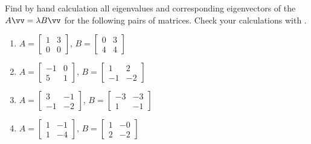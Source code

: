 \begin{exercise}  
Find by hand calculation all eigenvalues and corresponding eigenvectors of the  \(A\vv=\lambda B\vv\) for the following pairs of matrices.
Check your calculations with \script.
\begin{enumerate}
\item \(A=\begin{bmatrix} 1 & 3
\\ 0 & 0 \end{bmatrix}\),
\(B=\begin{bmatrix} 0 & 3
\\ 4 & 4 \end{bmatrix}\)

\item \(A=\begin{bmatrix} -1 & 0
\\ 5 & 1 \end{bmatrix}\),
\(B=\begin{bmatrix} 1 & 2
\\ -1 & -2 \end{bmatrix}\)

\item \(A=\begin{bmatrix} 3 & -1
\\ -1 & -2 \end{bmatrix}\),
\(B=\begin{bmatrix} -3 & -3
\\ 1 & -1 \end{bmatrix}\)

\item \(A=\begin{bmatrix} 1 & -1
\\ 1 & -4 \end{bmatrix}\),
\(B=\begin{bmatrix} 1 & -0
\\ 2 & -2 \end{bmatrix}\)


\end{enumerate}
\end{exercise}
